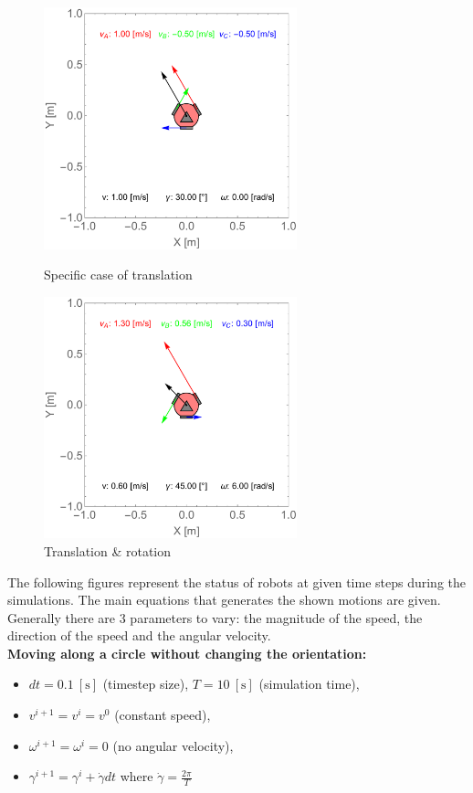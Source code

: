 \documentclass[12pt,english,twoside]{article}
\begin{document}
\begin{figure}[htb!]
	\centering
	\centering
	\includegraphics[height=7cm]{figures/2d_simulation/relation_v_1_g_30_w_0}
	\caption{Specific case of translation}
	\label{relation_v_1_g_30_w_0}
	\endminipage\hfill
	\centering
	\includegraphics[height=7cm]{figures/2d_simulation/relation_v_06_g_45_w_6}
	\caption{Translation \& rotation}
	\label{relation_v_06_g_45_w_6}
	\endminipage\hfill
\end{figure}
\newpage
The following figures represent the status of robots at given time steps during the simulations. The main equations that generates the shown motions are given. Generally there are 3 parameters to vary: the magnitude of the speed, the direction of the speed and the angular velocity.\\[0.3cm]
\noindent \textbf{Moving along a circle without changing the orientation:}
\begin{itemize}
	\item $dt=0.1~[\text{s}]$ (timestep size), $T=10~[\text{s}]$ (simulation time),
	\item $v^{i+1} = v^{i} = v^{0}$ (constant speed),
	\item $\omega^{i+1} = \omega^{i} = 0$ (no angular velocity),
	\item $\gamma^{i+1} = \gamma^i + \dot \gamma dt$ where $\dot \gamma = \frac{2 \pi}{T}$
\end{itemize}
\end{document}

